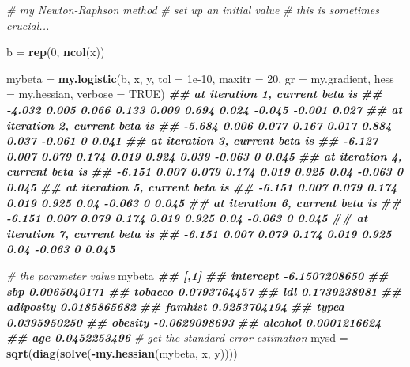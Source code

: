 \documentclass[
]{book}
\newenvironment{Shaded}{\begin{snugshade}}{\end{snugshade}}
\newcommand{\AttributeTok}[1]{\textcolor[rgb]{0.13,0.29,0.53}{#1}}
\newcommand{\CommentTok}[1]{\textcolor[rgb]{0.56,0.35,0.01}{\textit{#1}}}
\newcommand{\ConstantTok}[1]{\textcolor[rgb]{0.56,0.35,0.01}{#1}}
\newcommand{\DecValTok}[1]{\textcolor[rgb]{0.00,0.00,0.81}{#1}}
\newcommand{\DocumentationTok}[1]{\textcolor[rgb]{0.56,0.35,0.01}{\textbf{\textit{#1}}}}
\newcommand{\FloatTok}[1]{\textcolor[rgb]{0.00,0.00,0.81}{#1}}
\newcommand{\FunctionTok}[1]{\textcolor[rgb]{0.13,0.29,0.53}{\textbf{#1}}}
\newcommand{\NormalTok}[1]{#1}
\newcommand{\OtherTok}[1]{\textcolor[rgb]{0.56,0.35,0.01}{#1}}
\newcommand{\SpecialCharTok}[1]{\textcolor[rgb]{0.81,0.36,0.00}{\textbf{#1}}}
\theoremstyle{definition}
\theoremstyle{definition}
\theoremstyle{definition}
\theoremstyle{definition}
\theoremstyle{remark}
\begin{document}
\begin{Shaded}
\begin{Highlighting}[]
    \CommentTok{\# my Newton{-}Raphson method}
    \CommentTok{\# set up an initial value}
    \CommentTok{\# this is sometimes crucial...}
    
\NormalTok{    b }\OtherTok{=} \FunctionTok{rep}\NormalTok{(}\DecValTok{0}\NormalTok{, }\FunctionTok{ncol}\NormalTok{(x))}
    
\NormalTok{    mybeta }\OtherTok{=} \FunctionTok{my.logistic}\NormalTok{(b, x, y, }\AttributeTok{tol =} \FloatTok{1e{-}10}\NormalTok{, }\AttributeTok{maxitr =} \DecValTok{20}\NormalTok{, }
                         \AttributeTok{gr =}\NormalTok{ my.gradient, }\AttributeTok{hess =}\NormalTok{ my.hessian, }\AttributeTok{verbose =} \ConstantTok{TRUE}\NormalTok{)}
\DocumentationTok{\#\# at iteration 1, current beta is }
\DocumentationTok{\#\# {-}4.032 0.005 0.066 0.133 0.009 0.694 0.024 {-}0.045 {-}0.001 0.027}
\DocumentationTok{\#\# at iteration 2, current beta is }
\DocumentationTok{\#\# {-}5.684 0.006 0.077 0.167 0.017 0.884 0.037 {-}0.061 0 0.041}
\DocumentationTok{\#\# at iteration 3, current beta is }
\DocumentationTok{\#\# {-}6.127 0.007 0.079 0.174 0.019 0.924 0.039 {-}0.063 0 0.045}
\DocumentationTok{\#\# at iteration 4, current beta is }
\DocumentationTok{\#\# {-}6.151 0.007 0.079 0.174 0.019 0.925 0.04 {-}0.063 0 0.045}
\DocumentationTok{\#\# at iteration 5, current beta is }
\DocumentationTok{\#\# {-}6.151 0.007 0.079 0.174 0.019 0.925 0.04 {-}0.063 0 0.045}
\DocumentationTok{\#\# at iteration 6, current beta is }
\DocumentationTok{\#\# {-}6.151 0.007 0.079 0.174 0.019 0.925 0.04 {-}0.063 0 0.045}
\DocumentationTok{\#\# at iteration 7, current beta is }
\DocumentationTok{\#\# {-}6.151 0.007 0.079 0.174 0.019 0.925 0.04 {-}0.063 0 0.045}
    
    \CommentTok{\# the parameter value}
\NormalTok{    mybeta}
\DocumentationTok{\#\#                    [,1]}
\DocumentationTok{\#\# intercept {-}6.1507208650}
\DocumentationTok{\#\# sbp        0.0065040171}
\DocumentationTok{\#\# tobacco    0.0793764457}
\DocumentationTok{\#\# ldl        0.1739238981}
\DocumentationTok{\#\# adiposity  0.0185865682}
\DocumentationTok{\#\# famhist    0.9253704194}
\DocumentationTok{\#\# typea      0.0395950250}
\DocumentationTok{\#\# obesity   {-}0.0629098693}
\DocumentationTok{\#\# alcohol    0.0001216624}
\DocumentationTok{\#\# age        0.0452253496}
    \CommentTok{\# get the standard error estimation }
\NormalTok{    mysd }\OtherTok{=} \FunctionTok{sqrt}\NormalTok{(}\FunctionTok{diag}\NormalTok{(}\FunctionTok{solve}\NormalTok{(}\SpecialCharTok{{-}}\FunctionTok{my.hessian}\NormalTok{(mybeta, x, y))))    }
\end{Highlighting}
\end{Shaded}
\end{document}
